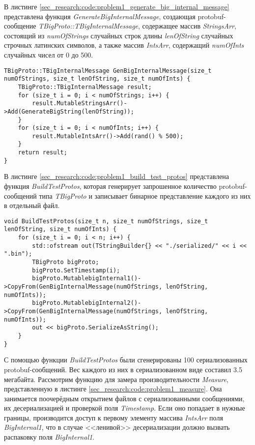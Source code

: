 В листинге \ref{sec_research:code:problem1_generate_big_internal_message} представлена функция \textit{GenerateBigInternalMessage}, создающая protobuf-сообщение \textit{TBigProto::TBigInternalMessage}, содержащее массив \textit{StringsArr}, состоящий из \textit{numOfStrings} случайных строк длины \textit{lenOfString} случайных строчных латинских символов, а также массив \textit{IntsArr}, содержащий \textit{numOfInts} случайных чисел от 0 до 500.

\noindent\begin{minipage}{\linewidth}
\begin{lstlisting}[style=CodeListing, caption={Функция GenerateBigInternalMessage}, label=sec_research:code:problem1_generate_big_internal_message]
TBigProto::TBigInternalMessage GenBigInternalMessage(size_t numOfStrings, size_t lenOfString, size_t numOfInts) {
    TBigProto::TBigInternalMessage result;
    for (size_t i = 0; i < numOfStrings; i++) {
        result.MutableStringsArr()->Add(GenerateBigString(lenOfString));
    }
    for (size_t i = 0; i < numOfInts; i++) {
        result.MutableIntsArr()->Add(rand() % 500);
    }
    return result;
}
\end{lstlisting}
\end{minipage}

В листинге \ref{sec_research:code:problem1_build_test_protos} представлена функция \textit{BuildTestProtos}, которая генерирует запрошенное количество protobuf-сообщений типа \textit{TBigProto} и записывает бинарное представление каждого из них в отдельный файл.

\noindent\begin{minipage}{\linewidth}
\begin{lstlisting}[style=CodeListing, caption={Функция BuildTestProtos}, label=sec_research:code:problem1_build_test_protos]
void BuildTestProtos(size_t n, size_t numOfStrings, size_t lenOfString, size_t numOfInts) {
    for (size_t i = 0; i < n; i++) {
        std::ofstream out(TStringBuilder{} << "./serialized/" << i << ".bin");
        TBigProto bigProto;
        bigProto.SetTimestamp(i);
        bigProto.MutablebigInternal1()->CopyFrom(GenBigInternalMessage(numOfStrings, lenOfString, numOfInts));
        bigProto.MutablebigInternal2()->CopyFrom(GenBigInternalMessage(numOfStrings, lenOfString, numOfInts));
        out << bigProto.SerializeAsString();
    }
}
\end{lstlisting}
\end{minipage}

С помощью функции \textit{BuildTestProtos} были сгенерированы 100 сериализованных protobuf-сообщений. Вес каждого из них в сериализованном виде составил 3.5 мегабайта.
Рассмотрим функцию для замера производительности \textit{Measure}, представленную в листинге \ref{sec_research:code:problem1_measure}.
Она занимается поочерёдным открытием файлов с сериализованными сообщениями,
их десериализацией и проверкой поля \textit{Timestamp}. Если оно попадает в нужные границы, производится доступ к первому элементу массива \textit{IntsArr} поля \textit{BigInternal1}, что в случае <<ленивой>> десериализации должно вызвать распаковку поля \textit{BigInternal1}.

